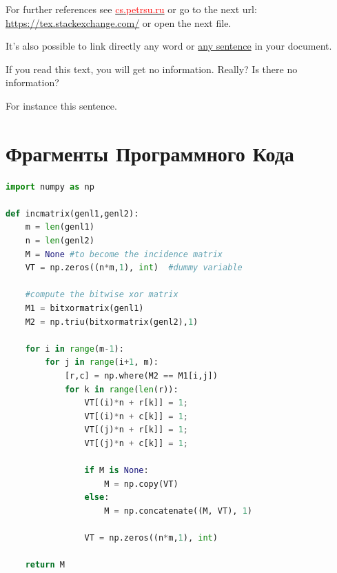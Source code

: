 \documentclass{article}
\begin{document}
For further references see \href{https://kappa.cs.petrsu.ru/~chistyak/documentation/}{\textcolor{red}{cs.petrsu.ru}} or go to the next url: \url{https://tex.stackexchange.com/} or open the next file.

It's also possible to link directly any word or \hyperlink{thesentence}{any sentence} in your document.

If you read this text, you will get no information.  Really?  Is there no information?

For instance \hypertarget{thesentence}{this sentence}.



\clearpage



\section{Фрагменты Программного Кода}
\begin{lstlisting}[language=Python, caption=Python example]
import numpy as np
    
def incmatrix(genl1,genl2):
    m = len(genl1)
    n = len(genl2)
    M = None #to become the incidence matrix
    VT = np.zeros((n*m,1), int)  #dummy variable
    
    #compute the bitwise xor matrix
    M1 = bitxormatrix(genl1)
    M2 = np.triu(bitxormatrix(genl2),1) 

    for i in range(m-1):
        for j in range(i+1, m):
            [r,c] = np.where(M2 == M1[i,j])
            for k in range(len(r)):
                VT[(i)*n + r[k]] = 1;
                VT[(i)*n + c[k]] = 1;
                VT[(j)*n + r[k]] = 1;
                VT[(j)*n + c[k]] = 1;
                
                if M is None:
                    M = np.copy(VT)
                else:
                    M = np.concatenate((M, VT), 1)
                
                VT = np.zeros((n*m,1), int)
    
    return M
\end{lstlisting}
\end{document}
